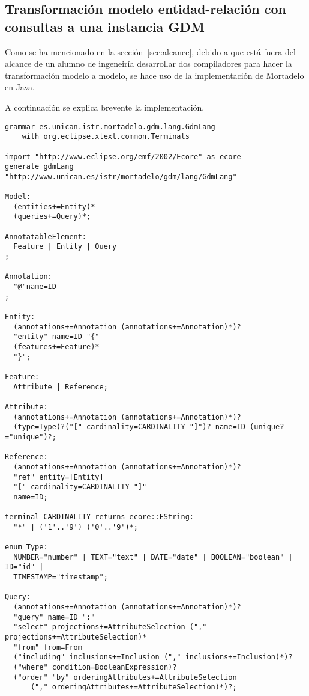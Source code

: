 \subsection{Transformación modelo entidad-relación con consultas a una instancia GDM}
Como se ha mencionado en la sección~\ref{sec:alcance}, debido a que está fuera del alcance de un alumno de ingeneiría desarrollar dos compiladores para hacer la transformación modelo a modelo, se hace uso de la implementación de Mortadelo en Java. 


A continuación se explica brevente la implementación.

\begin{code}
    \label{code:mortadelo-gdm-grammar}
    \begin{verbatim}
grammar es.unican.istr.mortadelo.gdm.lang.GdmLang
    with org.eclipse.xtext.common.Terminals

import "http://www.eclipse.org/emf/2002/Ecore" as ecore
generate gdmLang "http://www.unican.es/istr/mortadelo/gdm/lang/GdmLang"

Model:
  (entities+=Entity)*
  (queries+=Query)*;

AnnotatableElement:
  Feature | Entity | Query
;

Annotation:
  "@"name=ID
;

Entity:
  (annotations+=Annotation (annotations+=Annotation)*)?
  "entity" name=ID "{"
  (features+=Feature)*
  "}";

Feature:
  Attribute | Reference;

Attribute:
  (annotations+=Annotation (annotations+=Annotation)*)?
  (type=Type)?("[" cardinality=CARDINALITY "]")? name=ID (unique?="unique")?;

Reference:
  (annotations+=Annotation (annotations+=Annotation)*)?
  "ref" entity=[Entity]
  "[" cardinality=CARDINALITY "]"
  name=ID;

terminal CARDINALITY returns ecore::EString:
  "*" | ('1'..'9') ('0'..'9')*;

enum Type:
  NUMBER="number" | TEXT="text" | DATE="date" | BOOLEAN="boolean" | ID="id" |
  TIMESTAMP="timestamp";

Query:
  (annotations+=Annotation (annotations+=Annotation)*)?
  "query" name=ID ":"
  "select" projections+=AttributeSelection ("," projections+=AttributeSelection)*
  "from" from=From
  ("including" inclusions+=Inclusion ("," inclusions+=Inclusion)*)?
  ("where" condition=BooleanExpression)?
  ("order" "by" orderingAttributes+=AttributeSelection
      ("," orderingAttributes+=AttributeSelection)*)?;


\end{verbatim}
\end{code}
